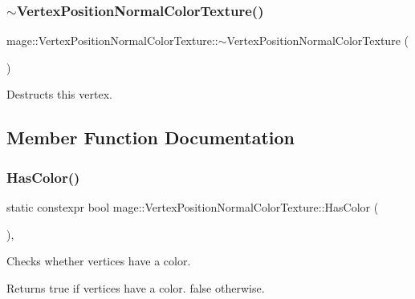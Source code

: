\subsubsection{\texorpdfstring{$\sim$\+Vertex\+Position\+Normal\+Color\+Texture()}{~VertexPositionNormalColorTexture()}}
{\footnotesize\ttfamily mage\+::\+Vertex\+Position\+Normal\+Color\+Texture\+::$\sim$\+Vertex\+Position\+Normal\+Color\+Texture (\begin{DoxyParamCaption}{ }\end{DoxyParamCaption})\hspace{0.3cm}{\ttfamily [default]}}

Destructs this vertex. 

\subsection{Member Function Documentation}
\hypertarget{structmage_1_1_vertex_position_normal_color_texture_aee56f3577ac93b0f57084ab76ec45abd}{}\label{structmage_1_1_vertex_position_normal_color_texture_aee56f3577ac93b0f57084ab76ec45abd} 
\subsubsection{\texorpdfstring{Has\+Color()}{HasColor()}}
{\footnotesize\ttfamily static constexpr bool mage\+::\+Vertex\+Position\+Normal\+Color\+Texture\+::\+Has\+Color (\begin{DoxyParamCaption}{ }\end{DoxyParamCaption})\hspace{0.3cm}{\ttfamily [static]}, {\ttfamily [noexcept]}}

Checks whether vertices have a color.

\begin{DoxyReturn}{Returns}
{\ttfamily true} if vertices have a color. {\ttfamily false} otherwise. 
\end{DoxyReturn}
\hypertarget{structmage_1_1_vertex_position_normal_color_texture_af1b565b25fd4beb2cff66931cc32de86}{}\label{structmage_1_1_vertex_position_normal_color_texture_af1b565b25fd4beb2cff66931cc32de86} 
